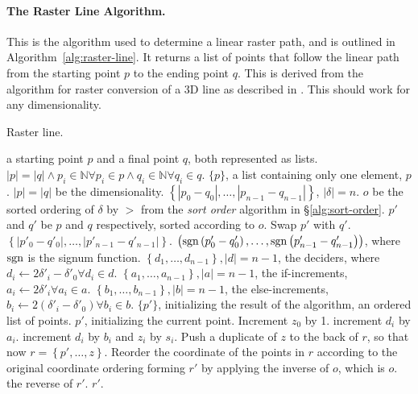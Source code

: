 \paragraph{The Raster Line Algorithm.}
This is the algorithm used to determine a linear raster path, and is outlined in Algorithm~\ref{alg:raster-line}.
It returns a list of points that follow the linear path from the starting point $p$ to the ending point $q$.
This is derived from the algorithm for raster conversion of a 3D line as described in \cite{KaufmanShimony1986}.
This should work for any dimensionality.
\begin{algorithm}[H]
\caption{Raster line.}
\label{alg:raster-line}
\begin{algorithmic}[1]
\INPUT a starting point $p$ and a final point $q$, both represented as lists.
\REQUIRE $|p| = |q| \land
   p_i \in \mathbb{N} \forall p_i \in p \land
   q_i \in \mathbb{N} \forall q_i \in q$.
  \RETURN $\{p\}$, a list containing only one element, $p$.
\ENDIF
{} $|p| = |q|$ be the dimensionality.
\LETARROW{$\delta$} $\left\{ |p_0 - q_0|, \ldots, |p_{n-1} - q_{n-1}| \right\}$, $|\delta| = n$.
\LET $o$ be the sorted ordering of $\delta$ by $>$ from the \emph{sort order} algorithm in \S\ref{alg:sort-order}.
\LET $p'$ and $q'$ be $p$ and $q$ respectively, sorted according to $o$.
   \STATE Swap $p'$ with $q'$.
\ENDIF
{} $\left\{ |p'_0 - q'_0|, \ldots, |p'_{n-1} - q'_{n-1}| \right\}$.
 $\left( \mathrm{sgn} \left( p'_0 - q'_0 \right), \ldots,
   \mathrm{sgn}\left( p'_{n-1} - q'_{n-1} \right) \right)$,
    where $\mathrm{sgn}$ is the signum function.
 $\left\{ d_1, \ldots, d_{n-1} \right\}, |d| = n-1$,
   the deciders, where $d_i \leftarrow 2 \delta'_i - \delta'_0 \forall d_i \in d$.
 $\left\{ a_1, \ldots, a_{n-1} \right\}, |a| = n-1$, the if-increments, $a_i \leftarrow 2 \delta'_i \forall a_i \in a$.
 $\left\{ b_1, \ldots, b_{n-1} \right\}, |b| = n-1$, the else-increments, $b_i \leftarrow 2 \left( \delta'_i - \delta'_0 \right) \forall b_i \in b$.
 $\{ p' \}$, initializing the result of the algorithm, an ordered list of points.
 $p'$, initializing the current point.
  \STATE Increment $z_0$ by 1.
      \STATE increment $d_i$ by $a_i$.
      \STATE increment $d_i$ by $b_i$ and $z_i$ by $s_i$.
    \ENDIF
  \ENDFOR
  \STATE Push a duplicate of $z$ to the back of $r$, so that now $r = \left\{ p', \ldots, z \right\}$.
\ENDWHILE
\STATE  Reorder the coordinate of the points in $r$ according to the original coordinate ordering forming $r'$ by applying the inverse of $o$, which is $o$.
  \RETURN the reverse of $r'$.
\ELSE
  \RETURN $r'$.
\ENDIF
\end{algorithmic}
\end{algorithm}

